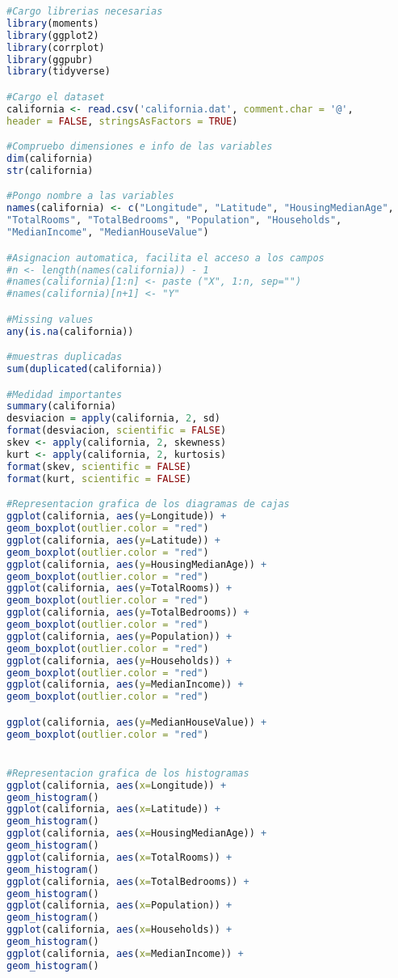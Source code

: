 	



\begin{lstlisting}[language=R]
#Cargo librerias necesarias
library(moments)
library(ggplot2)
library(corrplot)
library(ggpubr)
library(tidyverse)

#Cargo el dataset
california <- read.csv('california.dat', comment.char = '@', 
header = FALSE, stringsAsFactors = TRUE)

#Compruebo dimensiones e info de las variables
dim(california)
str(california)

#Pongo nombre a las variables
names(california) <- c("Longitude", "Latitude", "HousingMedianAge",
"TotalRooms", "TotalBedrooms", "Population", "Households",
"MedianIncome", "MedianHouseValue")

#Asignacion automatica, facilita el acceso a los campos
#n <- length(names(california)) - 1
#names(california)[1:n] <- paste ("X", 1:n, sep="")
#names(california)[n+1] <- "Y"

#Missing values
any(is.na(california))

#muestras duplicadas
sum(duplicated(california))

#Medidad importantes
summary(california)
desviacion = apply(california, 2, sd)
format(desviacion, scientific = FALSE)
skev <- apply(california, 2, skewness)
kurt <- apply(california, 2, kurtosis)
format(skev, scientific = FALSE)
format(kurt, scientific = FALSE)

#Representacion grafica de los diagramas de cajas
ggplot(california, aes(y=Longitude)) +
geom_boxplot(outlier.color = "red")
ggplot(california, aes(y=Latitude)) +
geom_boxplot(outlier.color = "red")
ggplot(california, aes(y=HousingMedianAge)) +
geom_boxplot(outlier.color = "red")
ggplot(california, aes(y=TotalRooms)) +
geom_boxplot(outlier.color = "red")
ggplot(california, aes(y=TotalBedrooms)) +
geom_boxplot(outlier.color = "red")
ggplot(california, aes(y=Population)) +
geom_boxplot(outlier.color = "red")
ggplot(california, aes(y=Households)) +
geom_boxplot(outlier.color = "red")
ggplot(california, aes(y=MedianIncome)) +
geom_boxplot(outlier.color = "red")

ggplot(california, aes(y=MedianHouseValue)) +
geom_boxplot(outlier.color = "red")


#Representacion grafica de los histogramas
ggplot(california, aes(x=Longitude)) +
geom_histogram()
ggplot(california, aes(x=Latitude)) +
geom_histogram()
ggplot(california, aes(x=HousingMedianAge)) +
geom_histogram()
ggplot(california, aes(x=TotalRooms)) +
geom_histogram()
ggplot(california, aes(x=TotalBedrooms)) +
geom_histogram()
ggplot(california, aes(x=Population)) +
geom_histogram()
ggplot(california, aes(x=Households)) +
geom_histogram()
ggplot(california, aes(x=MedianIncome)) +
geom_histogram()


\end{lstlisting}
